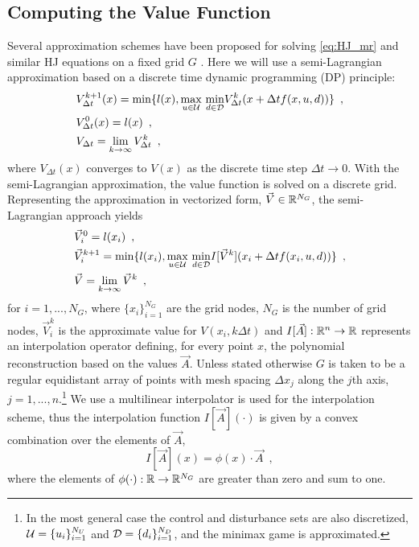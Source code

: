 \subsection{Computing the Value Function}
Several approximation schemes have been proposed for solving \eqref{eq:HJ_mr} and similar HJ equations on a fixed grid $G$ \cite{Bardi1999, Falcone1994, Mitchell2005,Osher2003,Sethian1996}. Here we will use a semi-Lagrangian approximation based on a discrete time dynamic programming (DP) principle:
%
\begin{subequations}
\begin{align}
&V_{\Delta t}^{k+1}(x) = \min\{l(x),  \underset{u\in\mathcal{U}}{\max}\text{ }\underset{ d\in\mathcal{D}}{\min} V^{k}_{\Delta t}(x+\Delta t f(x,u,d))\} \enspace,\\
&V_{\Delta t}^{0}(x) = l(x) \enspace,\\
&V_{\Delta t} = \lim_{k\rightarrow \infty} V^{k}_{\Delta t} \enspace,
\end{align}
\end{subequations}%
\noindent where $V_{\Delta t}(x)$ converges to $V(x)$ as the discrete time step $\Delta t \rightarrow 0$. With the semi-Lagrangian approximation, the value function is solved on a discrete grid. Representing the approximation in vectorized form, $\vec{V} \in \mathbb{R}^{N_G}$, the semi-Lagrangian approach yields \ 
\begin{subequations} \label{eq:dp_min_dist}
\begin{align}
&\vec{V}_{i}^{0} = l(x_i) \enspace,\\
&\vec{V}_{i}^{k+1} = \min\{l(x_i),  \underset{u\in\mathcal{U}}{\max}\text{ }\underset{ d\in\mathcal{D}}{\min} I[\vec{V}^{k}](x_i+\Delta t f(x_i,u,d)) \label{eq:dp_min_dist_b}\} \enspace,\\
&\vec{V} = \lim_{k\rightarrow \infty} \vec{V}^{k} \enspace,
\end{align}
\end{subequations}%
\noindent for  $i=1, ..., N_G$, where $\{x_i\}_{i=1}^{N_G}$ are the grid nodes, $N_G$ is the number of grid nodes, $\vec{V}_i^k$ is the approximate value for $V(x_i, k \Delta t)$ and ${I[\vec{A}]:\mathbb{R}^n \rightarrow \mathbb{R}}$ represents an interpolation operator defining, for every point $x$, the polynomial reconstruction based on the values $\vec{A}$. Unless stated otherwise $G$ is taken to be a regular equidistant array of points with mesh spacing $\Delta x_j$ along the $j$th axis, $j=1,...,n$.\footnote{In the most general case the control and disturbance sets are also discretized, $\mathcal{U}=\{u_i\}_{i=1}^{N_U}$ and $\mathcal{D}=\{d_i\}_{i=1}^{N_D}$, and the minimax game is approximated.} We use a multilinear interpolator is used for the interpolation scheme, thus the interpolation function $I[\vec{A}](\cdot)$ is given by a convex combination over the elements of $\vec{A}$,
\begin{equation}
I[\vec{A}](x)= \phi(x)\cdot \vec{A} \enspace,
\end{equation}%
\noindent where the elements of ${\phi(\cdot): \mathbb{R} \rightarrow \mathbb{R}^{N_G}}$ are greater than zero and sum to one. 

